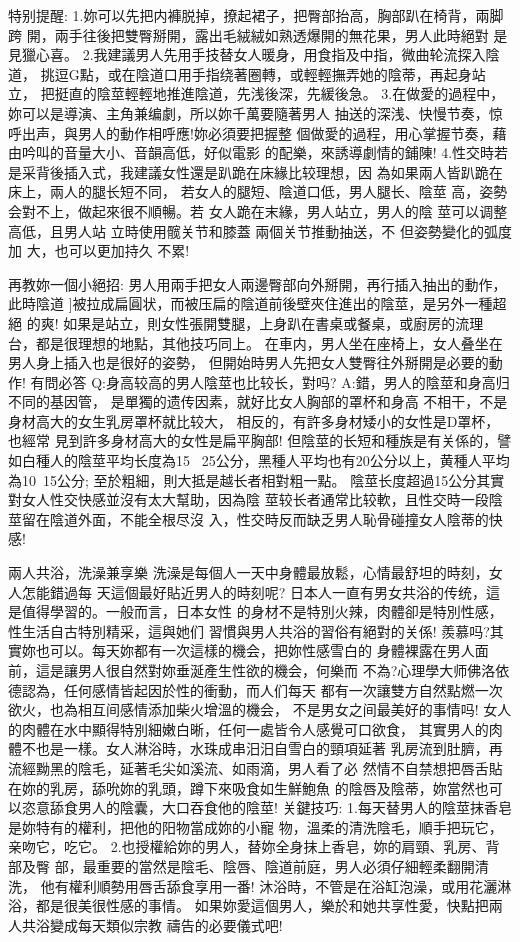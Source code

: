 \documentclass[12pt,UTF8]{ctexbook}
\begin{document}
特别提醒:
1.妳可以先把内褲脱掉，撩起裙子，把臀部抬高，胸部趴在椅背，兩脚跨
開，兩手往後把雙臀掰開，露出毛絨絨如熟透爆開的無花果，男人此時絕對
是見獵心喜。
2.我建議男人先用手技替女人暖身，用食指及中指，微曲轮流探入陰道，
挑逗G點，或在陰道口用手指绕著圈轉，或輕輕撫弄她的陰蒂，再起身站立，
把挺直的陰莖輕輕地推進陰道，先浅後深，先緩後急。
3.在做愛的過程中，妳可以是導演、主角兼编劇，所以妳千萬要隨著男人
抽送的深浅、快慢节奏，惊呼出声，與男人的動作相呼應!妳必須要把握整
個做愛的過程，用心掌握节奏，藉由吟叫的音量大小、音韻高低，好似電影
的配樂，來誘導劇情的鋪陳!
4.性交時若是采背後插入式，我建議女性還是趴跪在床緣比较理想，因
為如果兩人皆趴跪在床上，兩人的腿长短不同，
若女人的腿短、陰道口低，男人腿长、陰莖
高，姿勢会對不上，做起來很不順暢。若
女人跪在末緣，男人站立，男人的陰
莖可以调整高低，且男人站
立時使用髋关节和膝蓋
兩個关节推動抽送，不
但姿勢變化的弧度加
大，也可以更加持久
不累!

再教妳一個小絕招:
男人用兩手把女人兩邊臀部向外掰開，再行插入抽出的動作，此時陰道
]被拉成扁圓状，而被压扁的陰道前後壁夾住進出的陰莖，是另外一種超絕
的爽!
如果是站立，則女性張開雙腿，上身趴在書桌或餐桌，或廚房的流理
台，都是很理想的地點，其他技巧同上。
在車内，男人坐在座椅上，女人叠坐在男人身上插入也是很好的姿勢，
但開始時男人先把女人雙臀往外掰開是必要的動作!
有問必答
Q:身高较高的男人陰莖也比较长，對吗?
A:錯，男人的陰莖和身高归不同的基因管，
是單獨的遗传因素，就好比女人胸部的罩杯和身高
不相干，不是身材高大的女生乳房罩杯就比较大，
相反的，有許多身材矮小的女性是D罩杯，也經常
見到許多身材高大的女性是扁平胸部!
但陰莖的长短和種族是有关係的，譬如白種人的陰莖平均长度為15
~25公分，黑種人平均也有20公分以上，黄種人平均為10~15公分;
至於粗細，則大抵是越长者相對粗一點。
陰莖长度超過15公分其實對女人性交快感並沒有太大幫助，因為陰
莖较长者通常比较軟，且性交時一段陰莖留在陰道外面，不能全根尽沒
入，性交時反而缺乏男人恥骨碰撞女人陰蒂的快感!

兩人共浴，洗澡兼享樂
洗澡是每個人一天中身體最放鬆，心情最舒坦的時刻，女人怎能錯過每
天這個最好貼近男人的時刻呢?
日本人一直有男女共浴的传统，這是值得學習的。一般而言，日本女性
的身材不是特別火辣，肉體卻是特別性感，性生活自古特別精采，這與她们
習慣與男人共浴的習俗有絕對的关係!
羨慕吗?其實妳也可以。每天妳都有一次這樣的機会，把妳性感雪白的
身體裸露在男人面前，這是讓男人很自然對妳垂涎產生性欲的機会，何樂而
不為?心理學大师佛洛依德認為，任何感情皆起因於性的衝動，而人们每天
都有一次讓雙方自然點燃一次欲火，也為相互间感情添加柴火增溫的機会，
不是男女之间最美好的事情吗!
女人的肉體在水中顯得特別細嫩白晰，任何一處皆令人感覺可口欲食，
其實男人的肉體不也是一樣。女人淋浴時，水珠成串汨汨自雪白的頸項延著
乳房流到肚臍，再流經黝黑的陰毛，延著毛尖如溪流、如雨滴，男人看了必
然情不自禁想把唇舌貼在妳的乳房，舔吮妳的乳頭，蹲下來吸食如生鮮鮑魚
的陰唇及陰蒂，妳當然也可以恣意舔食男人的陰囊，大口吞食他的陰莖!
关鍵技巧:
1.每天替男人的陰莖抹香皂是妳特有的權利，把他的阳物當成妳的小寵
物，溫柔的清洗陰毛，順手把玩它，亲吻它，吃它。
2.也授權給妳的男人，替妳全身抹上香皂，妳的肩頸、乳房、背部及臀
部，最重要的當然是陰毛、陰唇、陰道前庭，男人必須仔細輕柔翻開清洗，
他有權利順勢用唇舌舔食享用一番!
沐浴時，不管是在浴缸泡澡，或用花灑淋浴，都是很美很性感的事情。
如果妳愛這個男人，樂於和她共享性愛，快點把兩人共浴變成每天類似宗教
禱告的必要儀式吧!
\end{document}
